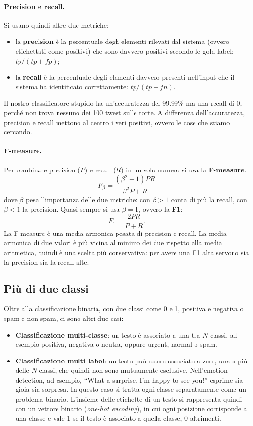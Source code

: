 \paragraph{Precision e recall.} Si usano quindi altre due metriche:
\begin{itemize}
    \item la \textbf{precision} è la percentuale degli elementi rilevati dal sistema (ovvero etichettati come positivi) che sono davvero positivi secondo le gold label: $tp / (tp + fp)$;
    \item la \textbf{recall} è la percentuale degli elementi davvero presenti nell'input che il sistema ha identificato correttamente: $tp / (tp + fn)$.
\end{itemize}
Il nostro classificatore stupido ha un'accuratezza del 99.99\% ma una recall di 0, perché non trova nessuno dei 100 tweet sulle torte. A differenza dell'accuratezza, precision e recall mettono al centro i veri positivi, ovvero le cose che stiamo cercando.

\paragraph{F-measure.} Per combinare precision ($P$) e recall ($R$) in un solo numero si usa la \textbf{F-measure}:
\begin{equation}
F_\beta = \frac{(\beta^2 + 1) P R}{\beta^2 P + R}
\end{equation}
dove $\beta$ pesa l'importanza delle due metriche: con $\beta > 1$ conta di più la recall, con $\beta < 1$ la precision. Quasi sempre si usa $\beta = 1$, ovvero la \textbf{F1}:
\begin{equation}
F_1 = \frac{2PR}{P + R}.
\end{equation}
La F-measure è una media armonica pesata di precision e recall. La media armonica di due valori è più vicina al minimo dei due rispetto alla media aritmetica, quindi è una scelta più conservativa: per avere una F1 alta servono sia la precision sia la recall alte.

\subsection{Più di due classi}
Oltre alla classificazione binaria, con due classi come 0 e 1, positiva e negativa o spam e non spam, ci sono altri due casi:
\begin{itemize}
    \item \textbf{Classificazione multi-classe}: un testo è associato a una tra $N$ classi, ad esempio positiva, negativa o neutra, oppure urgent, normal o spam.
    \item \textbf{Classificazione multi-label}: un testo può essere associato a zero, una o più delle $N$ classi, che quindi non sono mutuamente esclusive. Nell'emotion detection, ad esempio, \enquote{What a surprise, I'm happy to see you!} esprime sia gioia sia sorpresa. In questo caso si tratta ogni classe separatamente come un problema binario. L'insieme delle etichette di un testo si rappresenta quindi con un vettore binario (\textit{one-hot encoding}), in cui ogni posizione corrisponde a una classe e vale 1 se il testo è associato a quella classe, 0 altrimenti.
\end{itemize}

